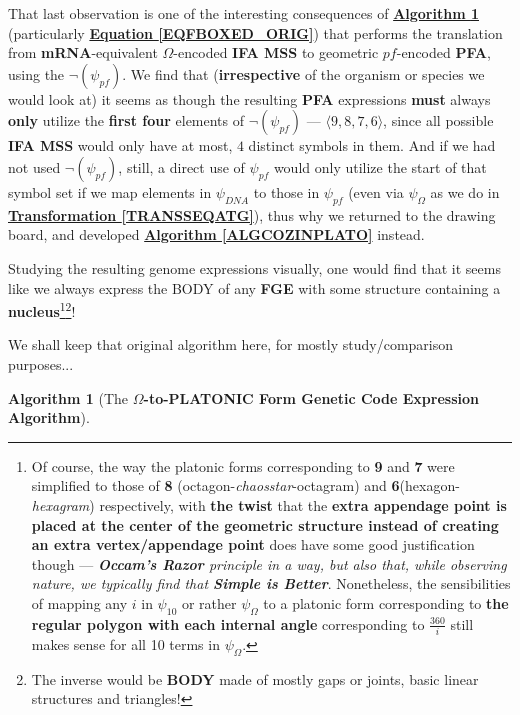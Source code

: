 \documentclass[a4paper, 18pt]{book} %
\newtheorem{alg}{Algorithm}
\begin{document}
\begin{appendices}
That last observation is one of the interesting consequences of \textbf{\hyperref[ALGCOZINPLATO_ORIG]{Algorithm \ref{ALGCOZINPLATO_ORIG}}} (particularly \textbf{\hyperref[EQFBOXED_ORIG]{Equation \ref{EQFBOXED_ORIG}}}) that performs the translation from \textbf{mRNA}-equivalent $\Omega$-encoded \textbf{IFA MSS} to geometric $pf$-encoded \textbf{PFA}, using the $\lnot(\psi_{pf})$. We find that (\textbf{irrespective} of the organism or species we would look at) it seems as though the resulting \textbf{PFA} expressions \textbf{must} always \textbf{only} utilize the \textbf{first four} elements of $\lnot(\psi_{pf})$ --- $\langle 9, 8, 7, 6 \rangle$, since all possible \textbf{IFA MSS} would only have at most, $4$ distinct symbols in them. And if we had not used $\lnot(\psi_{pf})$, still, a direct use of $\psi_{pf}$ would only utilize the start of that symbol set if we map elements in $\psi_{DNA}$ to those in $\psi_{pf}$ (even via $\psi_\Omega$ as we do in \textbf{\hyperref[TRANSSEQATG]{Transformation \ref{TRANSSEQATG}}}), thus why we returned to the drawing board, and developed \textbf{\hyperref[ALGCOZINPLATO]{Algorithm \ref{ALGCOZINPLATO}}} instead.

Studying the resulting genome expressions visually, one would find that it seems like we always express the BODY of any \textbf{FGE} with some structure containing a \textbf{nucleus}\footnote{Of course, the way the platonic forms corresponding to \textbf{9} and \textbf{7} were simplified to those of \textbf{8} (octagon-\textit{chaosstar}-octagram) and \textbf{6}(hexagon-\textit{hexagram}) respectively, with \textbf{the twist} that the \textbf{extra appendage point is placed at the center of the geometric structure instead of creating an extra vertex/appendage point} does have some good justification though --- \textit{\textbf{Occam's Razor} principle in a way, but also that, while observing nature, we typically find that \textbf{Simple is Better}}. Nonetheless, the sensibilities of mapping any $i$ in $\psi_{10}$ or rather $\psi_\Omega$ to a platonic form corresponding to \textbf{the regular polygon with each internal angle} corresponding to $\frac{360}{i}$ still makes sense for all 10 terms in $\psi_\Omega$.}\footnote{The inverse would be \textbf{BODY} made of mostly gaps or joints, basic linear structures and triangles!}!

We shall keep that original algorithm here, for mostly study/comparison purposes...

\begin{alg}[The \textbf{$\Omega$-to-PLATONIC Form Genetic Code Expression Algorithm}]
\label{ALGCOZINPLATO_ORIG}


\end{alg}
\end{appendices}
\end{document}
